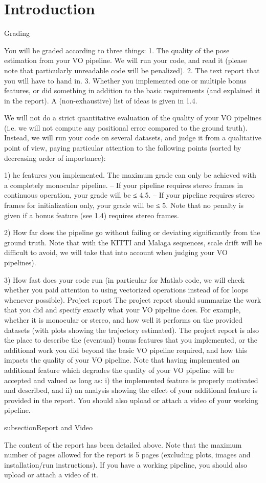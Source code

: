 \section{Introduction}
\label{s:Introduction}

Grading


You will be graded according to three things:
1. The quality of the pose estimation from your VO pipeline. We will run your code, and read it (please note that particularly unreadable code will be penalized).
2. The text report that you will have to hand in.
3. Whether you implemented one or multiple bonus features, or did something in addition to the basic requirements (and explained it in the report). A (non-exhaustive) list of ideas is given in 1.4.


We will not do a strict quantitative evaluation of the quality of your VO pipelines (i.e. we will not compute any positional error compared to the ground truth). Instead, we will run your code on several datasets, and judge it from a qualitative point of view, paying particular attention to the following points (sorted by decreasing order of importance):

1) he features you implemented. The maximum grade can only be achieved with a completely monocular pipeline.
– If your pipeline requires stereo frames in continuous operation, your grade will be ≤ 4.5. – If your pipeline requires stereo frames for initialization only, your grade will be ≤ 5. Note
that no penalty is given if a bonus feature (see 1.4) requires stereo frames.

2) How far does the pipeline go without failing or deviating significantly from the ground truth. Note that with the KITTI and Malaga sequences, scale drift will be difficult to avoid, we will take that into account when judging your VO pipelines).


3) How fast does your code run (in particular for Matlab code, we will check whether you paid attention to using vectorized operations instead of for loops whenever possible).
Project report The project report should summarize the work that you did and specify exactly what your VO pipeline does. For example, whether it is monocular or stereo, and how well it performs on the provided datasets (with plots showing the trajectory estimated). The project report is also the place to describe the (eventual) bonus features that you implemented, or the additional work you did beyond the basic VO pipeline required, and how this impacts the quality of your VO pipeline. Note that having implemented an additional feature which degrades the quality of your VO pipeline will be accepted and valued as long as: i) the implemented feature is properly motivated and described, and ii) an analysis showing the effect of your additional feature is provided in the report. You should also upload or attach a video of your working pipeline.


subsection{Report and Video}

The content of the report has been detailed above. Note that the maximum number of pages allowed for the report is 5 pages (excluding plots, images and installation/run instructions). If you have a working pipeline, you should also upload or attach a video of it.